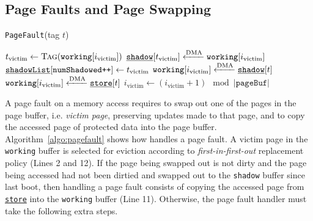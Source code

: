 
\subsection{Page Faults and Page Swapping}

\begin{algorithm}
	\caption{\texttt{PageFault}(tag $t$)}
	\label{algo:pagefault}
	\scriptsize
	\begin{algorithmic}[1]
        \State {}
        \State {}
        \State $t_\text{victim} \gets \Call{Tag}{\texttt{working}[i_\text{victim}]}$
			
		\State $\texttt{\underline{shadow}}[t_\text{victim}] \xleftarrow{\text{DMA}} \texttt{working}[i_\text{victim}]$
         
            \State $\texttt{\underline{shadowList}}[\texttt{numShadowed++}] \gets t_\text{victim}$
        \EndIf
		\EndIf
		 
		\State $\texttt{working}[i_\text{victim}] \xleftarrow{\text{DMA}} \texttt{\underline{shadow}}[t]$
		\Else
		\State $\texttt{working}[i_\text{victim}] \xleftarrow{\text{DMA}} \texttt{\underline{store}}[t]$
		\EndIf 
        \State $i_\text{victim} \gets (i_\text{victim} + 1) \mod |\texttt{pageBuf}|$ 
	\end{algorithmic}
\end{algorithm}

A page fault on a memory access requires \sys to swap out one of the pages in
the page buffer, i.e. \emph{victim page}, preserving updates made to that page,
and to copy the accessed page of protected data into the page buffer.
Algorithm~\ref{algo:pagefault} shows how \sys handles a page fault. A victim
page in the \texttt{working} buffer is selected for eviction according to
\emph{first-in-first-out} replacement policy (Lines 2 and 12).  If the page
being swapped out is not dirty and the page being accessed had not been dirtied
and swapped out to the \texttt{shadow} buffer since last boot, then
handling a page fault consists of copying the accessed page from
\texttt{\underline{store}} into the \texttt{working} buffer (Line 11).
Otherwise, the page fault handler must take the following extra steps.

